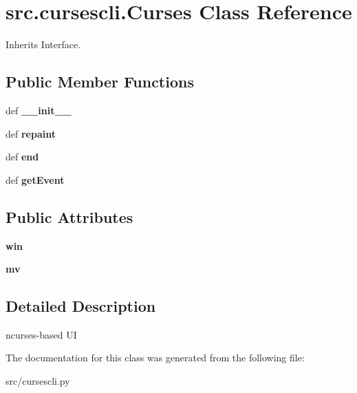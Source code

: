 \hypertarget{classsrc_1_1cursescli_1_1_curses}{\section{src.\-cursescli.\-Curses \-Class \-Reference}
\label{classsrc_1_1cursescli_1_1_curses}
}


\-Inherits \-Interface.

\subsection*{\-Public \-Member \-Functions}
\begin{DoxyCompactItemize}
\item 
\hypertarget{classsrc_1_1cursescli_1_1_curses_a0d7e4dc4ed49cdae37b923ab263c3336}{def {\bfseries \-\_\-\-\_\-init\-\_\-\-\_\-}}\label{classsrc_1_1cursescli_1_1_curses_a0d7e4dc4ed49cdae37b923ab263c3336}

\item 
\hypertarget{classsrc_1_1cursescli_1_1_curses_a39cd591bbf83f7f8b3d5ce187d9eb0ef}{def {\bfseries repaint}}\label{classsrc_1_1cursescli_1_1_curses_a39cd591bbf83f7f8b3d5ce187d9eb0ef}

\item 
\hypertarget{classsrc_1_1cursescli_1_1_curses_aa5b522eb03efec0f8357035e64b7ed98}{def {\bfseries end}}\label{classsrc_1_1cursescli_1_1_curses_aa5b522eb03efec0f8357035e64b7ed98}

\item 
\hypertarget{classsrc_1_1cursescli_1_1_curses_acfd11653f75e6ef128877ac8f8422fdf}{def {\bfseries get\-Event}}\label{classsrc_1_1cursescli_1_1_curses_acfd11653f75e6ef128877ac8f8422fdf}

\end{DoxyCompactItemize}
\subsection*{\-Public \-Attributes}
\begin{DoxyCompactItemize}
\item 
\hypertarget{classsrc_1_1cursescli_1_1_curses_aaede7b9ca804d5dbb9b62fb262010f67}{{\bfseries win}}\label{classsrc_1_1cursescli_1_1_curses_aaede7b9ca804d5dbb9b62fb262010f67}

\item 
\hypertarget{classsrc_1_1cursescli_1_1_curses_a339a2a3993480f3e87f69af13c8cd826}{{\bfseries mv}}\label{classsrc_1_1cursescli_1_1_curses_a339a2a3993480f3e87f69af13c8cd826}

\end{DoxyCompactItemize}


\subsection{\-Detailed \-Description}
\begin{DoxyVerb}ncurses-based UI \end{DoxyVerb}
 

\-The documentation for this class was generated from the following file\-:\begin{DoxyCompactItemize}
\item 
src/cursescli.\-py\end{DoxyCompactItemize}
